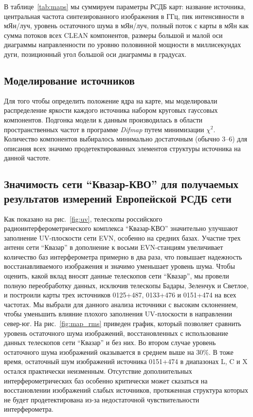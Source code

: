 В таблице~\ref{tab:maps} мы суммируем параметры РСДБ карт: название источника, центральная частота
синтезированного изображения в ГГц, пик интенсивности в мЯн/луч, уровень остаточного шума в
мЯн/луч, полный поток с карты в мЯн как сумма потоков всех CLEAN компонентов, размеры большой и
малой оси диаграммы направленности по уровню половинной мощности в миллисекундах дуги, позиционный
угол большой оси диаграммы в градусах.

\subsection{Моделирование источников}
\label{s:modeling}
Для того чтобы определить положение ядра на карте, мы моделировали распределение яркости каждого
источника набором круговых гауссовых компонентов. Подгонка модели к данным производилась в области
пространственных частот в программе \emph{Difmap} путем минимизации $\chi^2$. Количество компонентов
выбиралось минимально достаточным (обычно 3--6) для описания всех значимо продетектированных
элементов структуры источника на данной частоте.

\subsection{Значимость сети ``Квазар-КВО'' для получаемых результатов измерений Европейской РСДБ
сети}
\label{s:kvazar}
Как показано на рис.~\ref{fig:uv}, телескопы российского радиоинтерферометрического комплекса
``Квазар-КВО'' значительно улучшают заполнение UV-плоскости сети EVN, особенно на средних базах.
Участие трех антенн сети ``Квазар'' в дополнение к восьми EVN-станциям увеличивает количество
баз интерферометра примерно в два раза, что повышает надежность восстанавливаемого изображения и
значимо уменьшает уровень шума.
Чтобы оценить, какой вклад вносят данные телескопов сети ``Квазар'', мы провели полную переобработку
данных, исключив телескопы Бадары, Зеленчук и Светлое, и построили карты трех источников 0125+487,
0133+476 и 0151+474 на всех частотах. Мы выбрали для данного анализа источники с высоким
склонением, чтобы уменьшить влияние плохого заполнения UV-плоскости в направлении север-юг. На
рис.~\ref{fig:map_rms} приведен график, который позволяет сравнить уровень остаточного шума
изображений, восстановленных с использование данных телескопов сети ``Квазар'' и без них. Во втором
случае уровень остаточного шума изображений оказывается в среднем выше на 30\%. В тоже время,
остаточный шум изображений источника 0151+474 в диапазонах L, C и X остался практически неизменным.
Отсутствие дополнительных интерферометрических баз особенно критически может сказаться на
восстановлении изображений слабых источников, протяженная структура которых не будет
продетектирована из-за недостаточной  чувствительности интерферометра.

